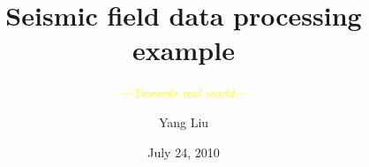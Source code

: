 


%
%
\newcommand{\liubang}{\fontsize{6pt}{\baselineskip}\selectfont}
\newcommand{\qibang}{\fontsize{7pt}{\baselineskip}\selectfont}
\newcommand{\babang}{\fontsize{8pt}{\baselineskip}\selectfont}
\newcommand{\jiubang}{\fontsize{9pt}{\baselineskip}\selectfont}
\newcommand{\shibang}{\fontsize{10pt}{\baselineskip}\selectfont}
\newcommand{\shiwubang}{\fontsize{15pt}{\baselineskip}\selectfont}
\newcommand{\shijiubang}{\fontsize{19pt}{\baselineskip}\selectfont}
\newcommand{\ershierbang}{\fontsize{22pt}{\baselineskip}\selectfont}

\title[Tutorial of Madagascar]{Seismic field data processing example} 

\subtitle{\textcolor{yellow}{---\;\emph{Towards real world}\;---}} %

\author[Y. Liu]{Yang Liu}


\date[Madagascar school 2010] %
{July 24, 2010}


